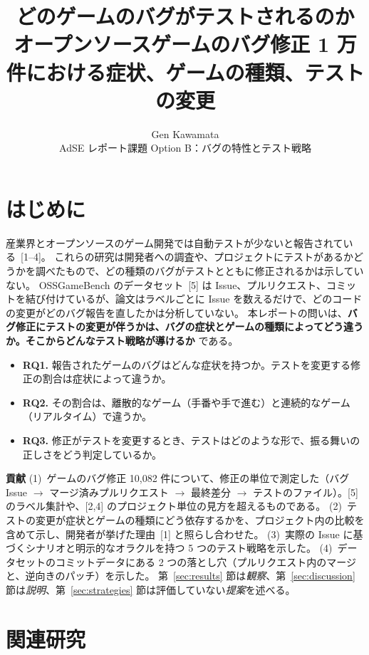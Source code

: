 \documentclass[a4paper,twocolumn,9pt]{ltjsarticle}
\title{\Large\bfseries どのゲームのバグがテストされるのか\\[2pt]
\large オープンソースゲームのバグ修正 1 万件における症状、ゲームの種類、テストの変更}
\author{Gen Kawamata\\[2pt]
\small AdSE レポート課題 Option B：バグの特性とテスト戦略}
\date{}
\newcommand{\para}[1]{\par\smallskip\noindent\textbf{#1}\quad}
\begin{document}
\maketitle

\section{はじめに}

産業界とオープンソースのゲーム開発では自動テストが少ないと報告されている~[1--4]。
これらの研究は開発者への調査や、プロジェクトにテストがあるかどうかを調べたもので、どの種類のバグがテストとともに修正されるかは示していない。
OSSGameBench のデータセット~[5] は Issue、プルリクエスト、コミットを結び付けているが、論文はラベルごとに Issue を数えるだけで、どのコードの変更がどのバグ報告を直したかは分析していない。
本レポートの問いは、\textbf{バグ修正にテストの変更が伴うかは、バグの症状とゲームの種類によってどう違うか。そこからどんなテスト戦略が導けるか} である。

\begin{itemize}
\item \textbf{RQ1.} 報告されたゲームのバグはどんな症状を持つか。テストを変更する修正の割合は症状によって違うか。
\item \textbf{RQ2.} その割合は、離散的なゲーム（手番や手で進む）と連続的なゲーム（リアルタイム）で違うか。
\item \textbf{RQ3.} 修正がテストを変更するとき、テストはどのような形で、振る舞いの正しさをどう判定しているか。
\end{itemize}

\para{貢献}
(1)~ゲームのバグ修正 10,082 件について、修正の単位で測定した（バグ Issue $\rightarrow$ マージ済みプルリクエスト $\rightarrow$ 最終差分 $\rightarrow$ テストのファイル）。[5] のラベル集計や、[2,4] のプロジェクト単位の見方を超えるものである。
(2)~テストの変更が症状とゲームの種類にどう依存するかを、プロジェクト内の比較を含めて示し、開発者が挙げた理由~[1] と照らし合わせた。
(3)~実際の Issue に基づくシナリオと明示的なオラクルを持つ 5 つのテスト戦略を示した。
(4)~データセットのコミットデータにある 2 つの落とし穴（プルリクエスト内のマージと、逆向きのパッチ）を示した。
第~\ref{sec:results} 節は\emph{観察}、第~\ref{sec:discussion} 節は\emph{説明}、第~\ref{sec:strategies} 節は評価していない\emph{提案}を述べる。

\section{関連研究}
\end{document}
